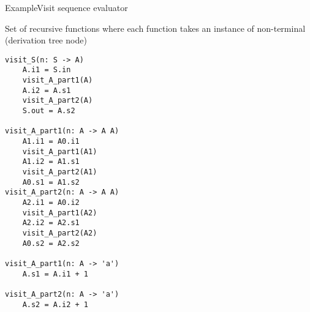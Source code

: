 \begin{frame}[fragile=singleslide]{Example}{Visit sequence evaluator}

Set of \alert{recursive functions} where each function takes an \alert{instance of non-terminal} (derivation tree node)

{\tiny
\begin{multicols}{2}
\begin{Verbatim}[fontsize=\scriptsize]
visit_S(n: S -> A)
    A.i1 = S.in
    visit_A_part1(A)
    A.i2 = A.s1
    visit_A_part2(A)
    S.out = A.s2

visit_A_part1(n: A -> A A)
    A1.i1 = A0.i1
    visit_A_part1(A1)
    A1.i2 = A1.s1
    visit_A_part2(A1)
    A0.s1 = A1.s2
visit_A_part2(n: A -> A A)
    A2.i1 = A0.i2
    visit_A_part1(A2)
    A2.i2 = A2.s1
    visit_A_part2(A2)
    A0.s2 = A2.s2

visit_A_part1(n: A -> 'a')
    A.s1 = A.i1 + 1

visit_A_part2(n: A -> 'a')
    A.s2 = A.i2 + 1
    
\end{Verbatim}
\end{multicols}
}

\end{frame}



